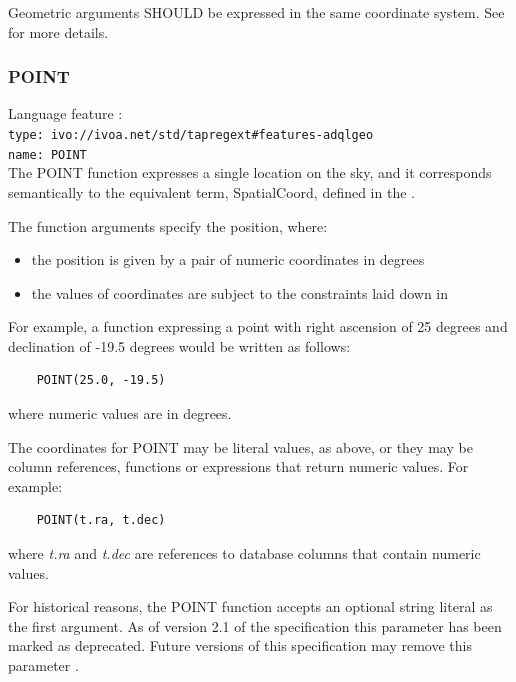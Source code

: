 \documentclass[11pt,a4paper]{ivoa}
\begin{document}
Geometric arguments SHOULD be expressed in the same coordinate system.
See  for more details.

\subsubsection{POINT}
\label{sec:functions.geom.point}
{\footnotesize Language feature :}\\
{\footnotesize \verb|type: ivo://ivoa.net/std/tapregext#features-adqlgeo|}\\
{\footnotesize \verb|name: POINT|}\\

The POINT function expresses a single location on the sky,
and it corresponds semantically to the equivalent term, SpatialCoord, defined in
the \STCSpec{}.

The function arguments specify the position, where:
\begin{itemize}
    \item the position is given by a pair of numeric coordinates in degrees
    \item the values of coordinates are subject to the constraints laid down in
\end{itemize}

For example, a function expressing a point with right ascension of 25 degrees
and declination of -19.5 degrees would be written as follows:
\begin{verbatim}
    POINT(25.0, -19.5)
\end{verbatim}
\noindent
where numeric values are in degrees.

The coordinates for POINT may be literal values, as above,
or they may be column references, functions or expressions that return
numeric values.
For example:
\begin{verbatim}
    POINT(t.ra, t.dec)
\end{verbatim}
\noindent
where \textit{t.ra} and \textit{t.dec} are references to database
columns that contain numeric values.

For historical reasons, the POINT function accepts an optional string literal
as the first argument.
As of version 2.1 of the specification this parameter has been
marked as deprecated.
Future versions of this specification may remove this parameter
.
\end{document}

